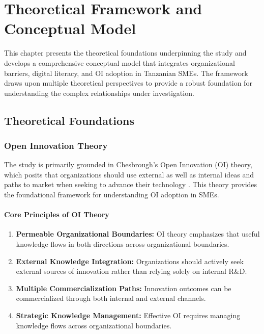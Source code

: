 \chapter{Theoretical Framework and Conceptual Model}

This chapter presents the theoretical foundations underpinning the study and develops a comprehensive conceptual model that integrates organizational barriers, digital literacy, and OI adoption in Tanzanian SMEs. The framework draws upon multiple theoretical perspectives to provide a robust foundation for understanding the complex relationships under investigation.

\section{Theoretical Foundations}

\subsection{Open Innovation Theory}

The study is primarily grounded in Chesbrough's Open Innovation (OI) theory, which posits that organizations should use external as well as internal ideas and paths to market when seeking to advance their technology \citep{chesbrough2003open, chesbrough2006open}. This theory provides the foundational framework for understanding OI adoption in SMEs.

\subsubsection{Core Principles of OI Theory}
\begin{enumerate}
    \item \textbf{Permeable Organizational Boundaries:} OI theory emphasizes that useful knowledge flows in both directions across organizational boundaries.
    \item \textbf{External Knowledge Integration:} Organizations should actively seek external sources of innovation rather than relying solely on internal R\&D.
    \item \textbf{Multiple Commercialization Paths:} Innovation outcomes can be commercialized through both internal and external channels.
    \item \textbf{Strategic Knowledge Management:} Effective OI requires managing knowledge flows across organizational boundaries.
\end{enumerate}

